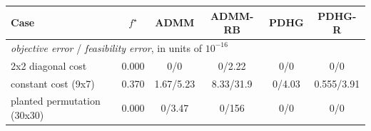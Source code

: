 \begin{tabular}{lccccc}
\toprule
Case & $f^\star$ & ADMM & ADMM-RB & PDHG & PDHG-R \\
\midrule
\multicolumn{6}{l}{\emph{objective error} / \emph{feasibility error}, in units of $10^{-16}$} \\
\midrule
2x2 diagonal cost & 0.000 & 0/0 & 0/2.22 & 0/0 & 0/0 \\
constant cost (9x7) & 0.370 & 1.67/5.23 & 8.33/31.9 & 0/4.03 & 0.555/3.91 \\
planted permutation (30x30) & 0.000 & 0/3.47 & 0/156 & 0/0 & 0/0 \\
\bottomrule
\end{tabular}